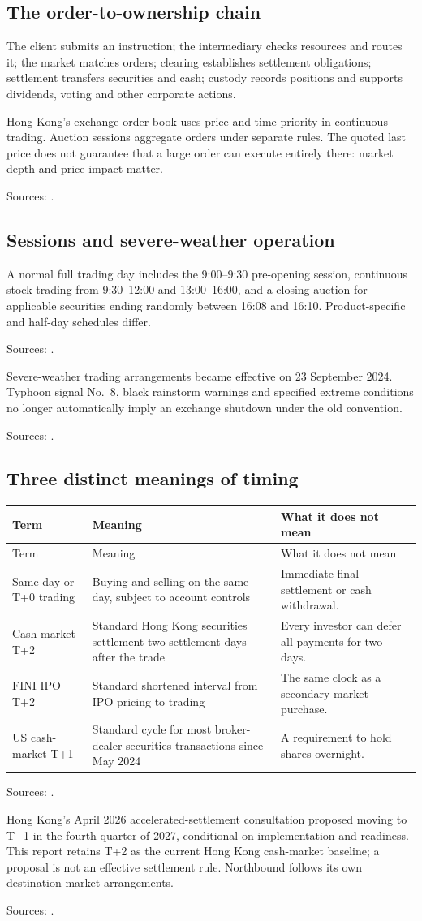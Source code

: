 \documentclass[11pt,a4paper]{article}
\newcommand{\source}[1]{\par{\footnotesize\color{ink}Sources: \cite{#1}.}\par}
\begin{document}
\subsection{The order-to-ownership chain}
The client submits an instruction; the intermediary checks resources and routes it; the market matches orders; clearing establishes settlement obligations; settlement transfers securities and cash; custody records positions and supports dividends, voting and other corporate actions.

Hong Kong's exchange order book uses price and time priority in continuous trading. Auction sessions aggregate orders under separate rules. The quoted last price does not guarantee that a large order can execute entirely there: market depth and price impact matter.\source{marketops}

\subsection{Sessions and severe-weather operation}
A normal full trading day includes the 9:00--9:30 pre-opening session, continuous stock trading from 9:30--12:00 and 13:00--16:00, and a closing auction for applicable securities ending randomly between 16:08 and 16:10. Product-specific and half-day schedules differ.\source{hours}

Severe-weather trading arrangements became effective on 23 September 2024. Typhoon signal No.\ 8, black rainstorm warnings and specified extreme conditions no longer automatically imply an exchange shutdown under the old convention.\source{weather}

\subsection{Three distinct meanings of timing}
\begin{longtable}{@{}L{4.1cm}L{5.5cm}L{5.9cm}@{}}
\toprule Term & Meaning & What it does not mean\\\midrule\endfirsthead
\toprule Term & Meaning & What it does not mean\\\midrule\endhead
Same-day or T+0 trading & Buying and selling on the same day, subject to account controls & Immediate final settlement or cash withdrawal.\\
Cash-market T+2 & Standard Hong Kong securities settlement two settlement days after the trade & Every investor can defer all payments for two days.\\
FINI IPO T+2 & Standard shortened interval from IPO pricing to trading & The same clock as a secondary-market purchase.\\
US cash-market T+1 & Standard cycle for most broker-dealer securities transactions since May 2024 & A requirement to hold shares overnight.\\
\bottomrule
\end{longtable}
\source{settlement,fini,ust1}
Hong Kong's April 2026 accelerated-settlement consultation proposed moving to T+1 in the fourth quarter of 2027, conditional on implementation and readiness. This report retains T+2 as the current Hong Kong cash-market baseline; a proposal is not an effective settlement rule. Northbound follows its own destination-market arrangements.\source{tplus}
\end{document}
